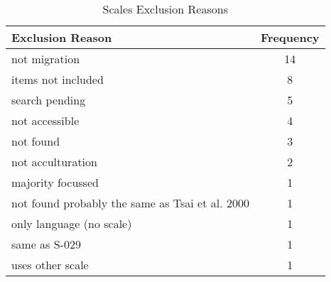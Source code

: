 \begin{wraptable}{l}{0pt}

\caption{\label{tab:ScalesExclusion}Scales Exclusion Reasons}
\centering
\begin{tabular}[t]{lc}
\toprule
Exclusion Reason & Frequency\\
\midrule
not migration & 14\\
items not included & 8\\
search pending & 5\\
not accessible & 4\\
not found & 3\\
not acculturation & 2\\
majority focussed & 1\\
not found probably the same as Tsai et al. 2000 & 1\\
only language (no scale) & 1\\
same as S-029 & 1\\
uses other scale & 1\\
\bottomrule
\end{tabular}
\end{wraptable}

